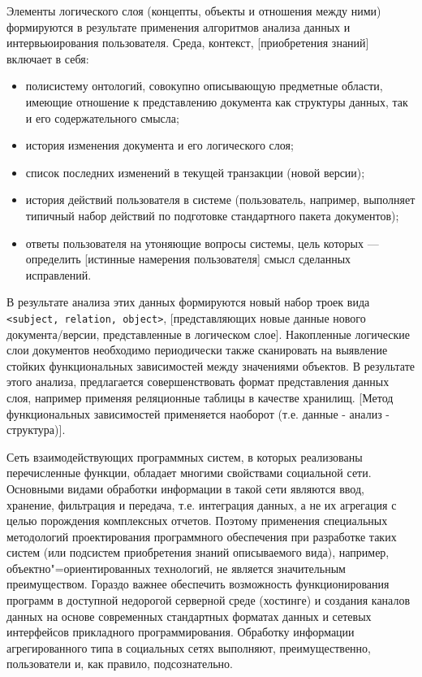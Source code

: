 \documentclass[utf8]{../IncArticle}
\newcommand{\e}[2][fcolor]{\textcolor{pcolor}{[}\textcolor{#1}{#2}\textcolor{pcolor}{]}}
\begin{document}
Элементы логического слоя (концепты, объекты и отношения между ними)
формируются в результате применения алгоритмов анализа данных и
интервьюирования пользователя.  Среда, контекст, \e{приобретения знаний}
включает в себя:
\begin{itemize}
\item полисистему онтологий, совокупно описывающую предметные области,
  имеющие отношение к представлению документа как структуры данных,
  так и его содержательного смысла;
\item история изменения документа и его логического слоя;
\item список последних изменений в текущей транзакции (новой версии);
\item история действий пользователя в системе (пользователь, например,
  выполняет типичный набор действий по подготовке стандартного пакета документов);
\item ответы пользователя на утоняющие вопросы системы, цель которых
  --- определить \e{истинные намерения пользователя} смысл сделанных исправлений.
\end{itemize}

В результате анализа этих данных формируются новый набор троек вида
\texttt{<subject, relation, object>}, \e{представляющих новые данные
нового документа/версии, представленные в логическом
слое}.  Накопленные логические слои документов необходимо периодически
также сканировать на выявление стойких функциональных зависимостей
между значениями объектов.  В результате этого анализа, предлагается
совершенствовать формат представления данных слоя, например применяя
реляционные таблицы в качестве хранилищ.  \e{Метод функциональных
зависимостей применяется наоборот (т.е. данные - анализ - структура)}.

Сеть взаимодействующих программных систем, в которых реализованы
перечисленные функции, обладает многими свойствами социальной сети.
Основными видами обработки информации в такой сети являются ввод,
хранение, фильтрация и передача, т.е. интеграция данных, а не их
агрегация с целью порождения комплексных отчетов.  Поэтому применения
специальных методологий проектирования программного обеспечения при
разработке таких систем (или подсистем приобретения знаний
описываемого вида), например, объектно"=ориентированных технологий, не
является значительным преимуществом.  Гораздо важнее обеспечить
возможность функционирования программ в доступной недорогой серверной
среде (хостинге) и создания каналов данных на основе современных
стандартных форматах данных и сетевых интерфейсов прикладного
программирования.  Обработку информации агрегированного типа в
социальных сетях выполняют, преимущественно, пользователи и, как
правило, подсознательно.
\end{document}
